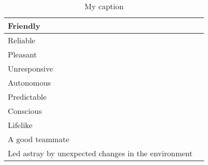 \begin{table}[]
\begin{tabular}{l|l}
		Friendly & \\ \hline
		Reliable & \\ \hline
		Pleasant & \\ \hline
		Unresponsive & \\ \hline
		Autonomous & \\ \hline
		Predictable & \\ \hline
		Conscious & \\ \hline
		Lifelike & \\ \hline
		A good teammate & \\ \hline
		Led astray by unexpected changes in the environment & \\
	\end{tabular}
	\caption{My caption}
	\label{my-label}
\end{table}